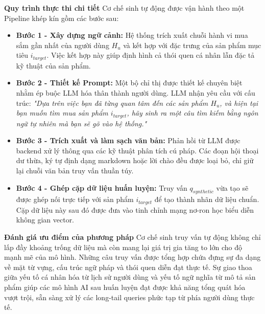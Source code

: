 \noindent \textbf{Quy trình thực thi chi tiết}
Cơ chế sinh tự động được vận hành theo một Pipeline khép kín gồm các bước sau:
\begin{itemize}
    \item \textbf{Bước 1 - Xây dựng ngữ cảnh:} Hệ thống trích xuất chuỗi hành vi mua sắm gần nhất của người dùng $H_u$ và kết hợp với đặc trưng của sản phẩm mục tiêu $i_{target}$. Việc kết hợp này giúp định hình cả thói quen cá nhân lẫn đặc tả kỹ thuật của sản phẩm.
    \item \textbf{Bước 2 - Thiết kế Prompt:} Một bộ chỉ thị được thiết kế chuyên biệt nhằm ép buộc LLM hóa thân thành người dùng. LLM nhận yêu cầu với cấu trúc: \textit{"Dựa trên việc bạn đã từng quan tâm đến các sản phẩm $H_u$, và hiện tại bạn muốn tìm mua sản phẩm $i_{target}$, hãy sinh ra một câu tìm kiếm bằng ngôn ngữ tự nhiên mà bạn sẽ gõ vào hệ thống."}
    \item \textbf{Bước 3 - Trích xuất và làm sạch văn bản:} Phản hồi từ LLM được backend xử lý thông qua các kỹ thuật phân tích cú pháp. Các đoạn hội thoại dư thừa, ký tự định dạng markdown hoặc lời chào đều được loại bỏ, chỉ giữ lại chuỗi văn bản truy vấn thuần túy.
    \item \textbf{Bước 4 - Ghép cặp dữ liệu huấn luyện:} Truy vấn $q_{synthetic}$ vừa tạo sẽ được ghép nối trực tiếp với sản phẩm $i_{target}$ để tạo thành nhãn dữ liệu chuẩn. Cặp dữ liệu này sau đó được đưa vào tinh chỉnh mạng nơ-ron học biểu diễn không gian vector.
\end{itemize}

\noindent \textbf{Đánh giá ưu điểm của phương pháp}
Cơ chế sinh truy vấn tự động không chỉ lấp đầy khoảng trống dữ liệu mà còn mang lại giá trị gia tăng to lớn cho độ mạnh mẽ của mô hình. Những câu truy vấn được tổng hợp chứa đựng sự đa dạng về mặt từ vựng, cấu trúc ngữ pháp và thói quen diễn đạt thực tế. Sự giao thoa giữa yếu tố cá nhân hóa từ lịch sử người dùng và yếu tố ngữ nghĩa từ mô tả sản phẩm giúp các mô hình AI sau huấn luyện đạt được khả năng tổng quát hóa vượt trội, sẵn sàng xử lý các long-tail queries phức tạp từ phía người dùng thực tế.